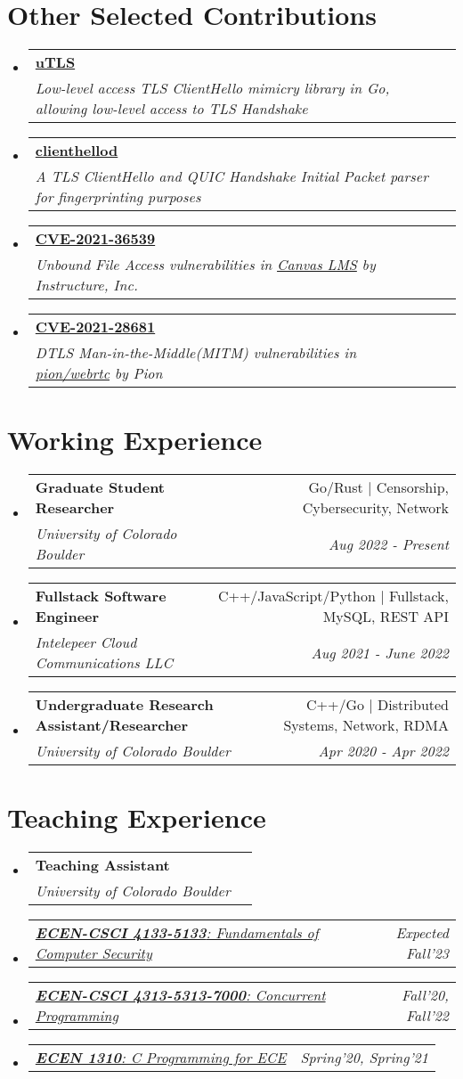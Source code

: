 \documentclass[letterpaper,11pt]{article}
\makeatletter
\newcommand{\resumeSubheading}[4]{
  \vspace{-2pt}\item
    \begin{tabular*}{0.97\textwidth}[t]{l@{\extracolsep{\fill}}r}
      \textbf{#1} & #2 \\
      \textit{\small#3} & \textit{\small #4} \\
    \end{tabular*}\vspace{-7pt}
}
\newcommand{\resumeSubSubheading}[2]{
    \item
    \begin{tabular*}{0.97\textwidth}{l@{\extracolsep{\fill}}r}
      \textit{\small#1} & \textit{\small #2} \\
    \end{tabular*}\vspace{-7pt}
}
\newcommand{\resumeSubHeadingListStart}{\begin{itemize}[leftmargin=0.15in, label={}]}
\newcommand{\resumeSubHeadingListEnd}{\end{itemize}}
\makeatother
\begin{document}
\section{Other Selected Contributions}
\resumeSubHeadingListStart
\resumeSubheading
{\href{https://github.com/refraction-networking/utls}{\textbf{uTLS}}}{}
{Low-level access TLS ClientHello mimicry library in Go, allowing low-level access to TLS Handshake}{}
\resumeSubheading
{\href{https://github.com/gaukas/clienthellod}{\textbf{clienthellod}}}{}
{A TLS ClientHello and QUIC Handshake Initial Packet parser for fingerprinting purposes}{}
\resumeSubheading
{\href{https://cve.mitre.org/cgi-bin/cvename.cgi?name=CVE-2021-36539}{\textbf{CVE-2021-36539}}}{}
{Unbound File Access vulnerabilities in \href{https://www.instructure.com/canvas}{Canvas LMS} by \emph{Instructure, Inc.}}{}
\resumeSubheading
{\href{https://cve.mitre.org/cgi-bin/cvename.cgi?name=CVE-2021-28681}{\textbf{CVE-2021-28681}}}{}
{DTLS Man-in-the-Middle(MITM) vulnerabilities in \href{https://github.com/pion/webrtc}{pion/webrtc} by \emph{Pion}}{}
\resumeSubHeadingListEnd
\vspace{1pt}

\section{Working Experience}
\resumeSubHeadingListStart
\resumeSubheading
{Graduate Student Researcher}{Go/Rust $|$ Censorship, Cybersecurity, Network}
{University of Colorado Boulder}{Aug 2022 - Present}
\resumeSubheading
{Fullstack Software Engineer}{C++/JavaScript/Python $|$ Fullstack, MySQL, REST API}
{Intelepeer Cloud Communications LLC}{Aug 2021 - June 2022}
\resumeSubheading
{Undergraduate Research Assistant/Researcher}{C++/Go $|$ Distributed Systems, Network, RDMA}
{University of Colorado Boulder}{Apr 2020 - Apr 2022}
\resumeSubHeadingListEnd
\vspace{1pt}

\section{Teaching Experience}
\resumeSubHeadingListStart
\resumeSubheading
{Teaching Assistant}{}
{University of Colorado Boulder}{}
\resumeSubSubheading
{\href{https://experts.colorado.edu/display/coursename_ECEN-4133}{\textbf{ECEN-CSCI 4133-5133}: Fundamentals of Computer Security}}{Expected Fall'23}
\resumeSubSubheading
{\href{https://experts.colorado.edu/display/coursename_ECEN-4313}{\textbf{ECEN-CSCI 4313-5313-7000}: Concurrent Programming}}{Fall'20, Fall'22}
\resumeSubSubheading
{\href{https://experts.colorado.edu/display/coursename_ECEN-1310}{\textbf{ECEN 1310}: C Programming for ECE}}{Spring'20, Spring'21}\resumeSubHeadingListEnd
\vspace{1pt}
\end{document}

